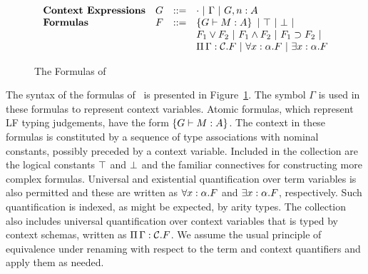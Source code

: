 \begin{figure}[tbhp]
\[\begin{array}{lrcl}
\mbox{\bf Context Expressions} & G & ::= &
    \emptyce\ |\ \Gamma\ |\ G,n:A\\
\mbox{\bf Formulas} & F & ::= & \fatm{G}{\of{M}{A}}\ |\ \ftrue\ |\ \ffalse\ |\\
& & & \myfor{F_1}{F_2}\ |\ \fand{F_1}{F_2}\ |\ \fimp{F_1}{F_2}\ |\\
& & &\fctx{\Gamma}{\mathcal{C}}{F}\ |\ \fall{x:\alpha}{F}\ |\ \fexists{x:\alpha}{F}
\end{array}\]
\caption{The Formulas of \logic}
\label{fig:formula-syntax}
\end{figure}

The syntax of the formulas of \logic\ is presented in
Figure~\ref{fig:formula-syntax}.
%
The symbol $\Gamma$ is used in these formulas to represent context
variables.
%
Atomic formulas, which represent LF typing judgements, have the form
$\left\{G \vdash M:A\right\}$.
%
The context in these formulas is constituted by a sequence of type
associations with nominal constants, possibly preceded by a context
variable.
%
Included in the collection are the logical constants $\top$ and
$\bot$ and the familiar connectives for constructing more complex
formulas.
%
Universal and existential quantification over term variables is also
permitted and these are written as $\forall x:\alpha. F$ and
$\exists x:\alpha. F$, respectively.
%
Such quantification is indexed, as might be expected, by arity types.
%
The collection also includes universal quantification over context
variables that is typed by context schemas, written as
$\Pi\,\Gamma : \mathcal{C}.F$.
%
We assume the usual principle of equivalence under renaming with
respect to the term and context quantifiers and apply them as needed. 

